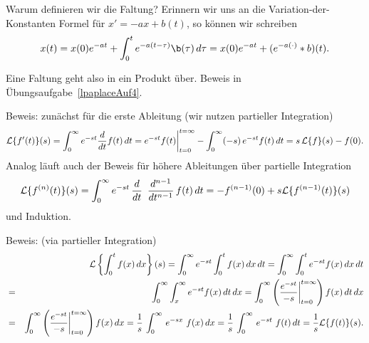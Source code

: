 Warum definieren wir die Faltung? Erinnern wir uns an 
die Variation-der-Konstanten Formel f\"ur $x'=-a x + b(t)$, 
so k\"onnen wir schreiben
$$x(t) 
= x(0)e^{-at} + \int_0^t e^{-a(t-\tau)}\b(\tau)\, d\tau 
= x(0)e^{-at} + (e^{-a(\cdot)}\ast b)(t).$$

\par\medskip
 Eine Faltung geht also in ein Produkt \"uber.
Beweis in \"Ubungsaufgabe~\ref{lpaplaceAuf4}.
\par\medskip


\par\medskip
Beweis: zun\"achst f\"ur die erste Ableitung (wir nutzen partieller Integration)
$$
{\cal L}\{f'(t)\}(s) 
= \int_0^\infty e^{- s t} \frac d {dt}f(t)\, dt
= e^{-st}f(t)\bigg|_{t=0}^{t=\infty} - \int_0^\infty (-s)\,e^{- s t} f(t)\, dt
= s\,{\cal L}\{f\}(s)-f(0).
$$
Analog l\"auft auch der Beweis f\"ur h\"ohere Ableitungen \"uber partielle Integration
$${\cal L}\{f^{(n)}(t)\}(s)
= \int_0^\infty e^{-st}\, \frac d {dt}\,\,\,\frac{d^{n-1}}{dt^{n-1}}\, f(t)\, dt 
= -f^{(n-1)}(0) + s {\cal L}\{f^{(n-1)}(t)\}(s)$$
und Induktion.

\par\medskip
Beweis: (via partieller Integration)
\begin{eqnarray*}
&&{\cal L}\left\{\int_0^t f(x)\, dx\right\}(s) 
= \int_0^\infty e^{- s t} \int_0^t f(x)\, dx\, dt
= \int_0^\infty\int_0^t e^{- s t}  f(x)\, dx\, dt\\
&=& \int_0^\infty\int_x^\infty e^{- s t}  f(x)\, dt\, dx
= \int_0^\infty\left(\frac{e^{-st}}{-s}\bigg|_{t=0}^{t=\infty}\right) f(x)\, dt\, dx\\
&=& \int_0^\infty\left(\frac{e^{-st}}{-s}\bigg|_{t=0}^{t=\infty}\right) f(x)\, dx
= \frac 1 s \,\int_0^\infty\, e^{-sx}\,\, f(x)\, dx 
= \frac 1 s \,\int_0^\infty\, e^{-st}\,\, f(t)\, dt = 
\frac 1 s {\cal L}\{f(t)\}(s).
\end{eqnarray*}



